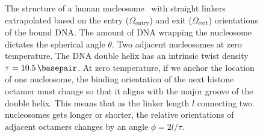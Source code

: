 \documentclass[%
 reprint,
superscriptaddress,
showpacs,preprintnumbers,
 amsmath,amssymb,
 aps,
 prl,
]{revtex4-1}
\begin{document}
\begin{figure}[t]
    \centering
    \hfill{}
    \caption{\protect{} The structure of a
        human nucleosome~\cite{wakamori2015} with straight linkers extrapolated
        based on the entry ($\Omega_\text{entry}$) and exit ($\Omega_\text{exit}$)
        orientations of the bound DNA\@.
    The amount of DNA wrapping the nucleosome dictates the spherical angle
        $\theta$.
    \protect{} Two adjacent nucleosomes at zero
        temperature.
    The DNA double helix has an intrinsic twist density
        $\tau=\SI{10.5}{\basepair}$.
    At zero temperature, if we anchor the location of one nucleosome, the
        binding orientation of the next histone octamer must change so that it
        aligns with the major groove of the double helix.
    This means that as the linker length $l$ connecting two nucleosomes gets
        longer or shorter, the relative orientations of adjacent octamers
        changes by an angle $\phi = 2l/\tau$.
    }\label{fig:nuc-geo}
\end{figure}
\end{document}
